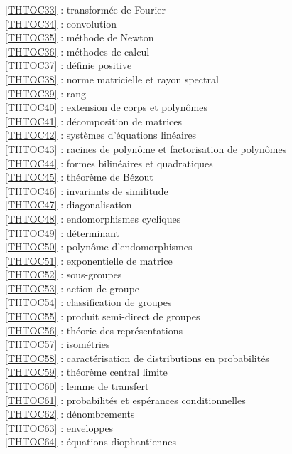 \ref {THTOC33} : transformée de Fourier\\
\ref {THTOC34} : convolution\\
\ref {THTOC35} : méthode de Newton\\
\ref {THTOC36} : méthodes de calcul\\
\ref {THTOC37} : définie positive\\
\ref {THTOC38} : norme matricielle et rayon spectral\\
\ref {THTOC39} : rang\\
\ref {THTOC40} : extension de corps et polynômes\\
\ref {THTOC41} : décomposition de matrices\\
\ref {THTOC42} : systèmes d'équations linéaires\\
\ref {THTOC43} : racines de polynôme et factorisation de polynômes\\
\ref {THTOC44} : formes bilinéaires et quadratiques\\
\ref {THTOC45} : théorème de Bézout\\
\ref {THTOC46} : invariants de similitude\\
\ref {THTOC47} : diagonalisation\\
\ref {THTOC48} : endomorphismes cycliques\\
\ref {THTOC49} : déterminant\\
\ref {THTOC50} : polynôme d'endomorphismes\\
\ref {THTOC51} : exponentielle de matrice\\
\ref {THTOC52} : sous-groupes\\
\ref {THTOC53} : action de groupe\\
\ref {THTOC54} : classification de groupes\\
\ref {THTOC55} : produit semi-direct de groupes\\
\ref {THTOC56} : théorie des représentations\\
\ref {THTOC57} : isométries\\
\ref {THTOC58} : caractérisation de distributions en probabilités\\
\ref {THTOC59} : théorème central limite\\
\ref {THTOC60} : lemme de transfert\\
\ref {THTOC61} : probabilités et espérances conditionnelles\\
\ref {THTOC62} : dénombrements\\
\ref {THTOC63} : enveloppes\\
\ref {THTOC64} : équations diophantiennes\\
